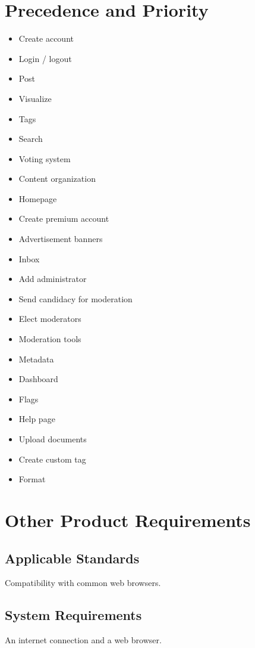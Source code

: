 \documentclass [a4paper, 11pt]{article}
\begin{document}
\section{Precedence and Priority}
\begin{itemize}
		\item Create account
		\item Login / logout
		\item Post
		\item Visualize
		\item Tags
		\item Search
		\item Voting system
		\item Content organization
		\item Homepage
		\item Create premium account
		\item Advertisement banners
		\item Inbox
		\item Add administrator
		\item Send candidacy for moderation
		\item Elect moderators
		\item Moderation tools
		\item Metadata
		\item Dashboard
		\item Flags
		\item Help page
		\item Upload documents
		\item Create custom tag
		\item Format
\end{itemize}



\section{Other Product Requirements}
\subsection{Applicable Standards}
Compatibility with common web browsers.

\subsection{System Requirements}
An internet connection and a web browser.

\end{document}
